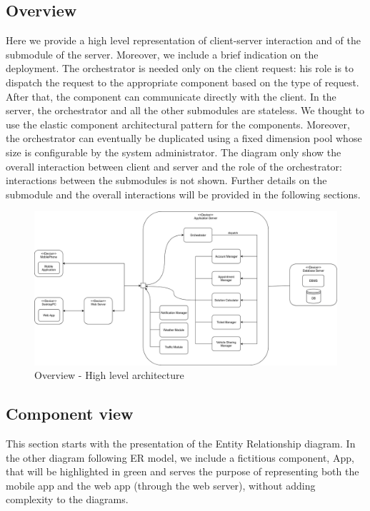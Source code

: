 \subsection{Overview}
	Here we provide a high level representation of client-server interaction and of the submodule of the server. Moreover, we include a brief indication on the deployment.\newline
	The orchestrator is needed only on the client request: his role is to dispatch the request to the appropriate component based on the type of request. After that, the component can communicate directly with the client.\newline
	In the server, the orchestrator and all the other submodules are stateless. We thought to use the elastic component architectural pattern for the components. Moreover, the orchestrator can eventually be duplicated using a fixed dimension pool whose size is configurable by the system administrator.\newline
	The diagram only show the overall interaction between client and server and the role of the orchestrator: interactions between the submodules is not shown. Further details on the submodule and the overall interactions will be provided in the following sections.

	\begin{figure}[H]
		\centerline{\includegraphics[width=0.9\paperwidth]{Images/Overview}}
		\caption{Overview - High level architecture}
	\end{figure}

\filbreak
\subsection{Component view}
	This section starts with the presentation of the Entity Relationship diagram. In the other diagram following ER model, we include a fictitious component, App, that will be highlighted in green and serves the purpose of representing both the mobile app and the web app (through the web server), without adding complexity to the diagrams.
